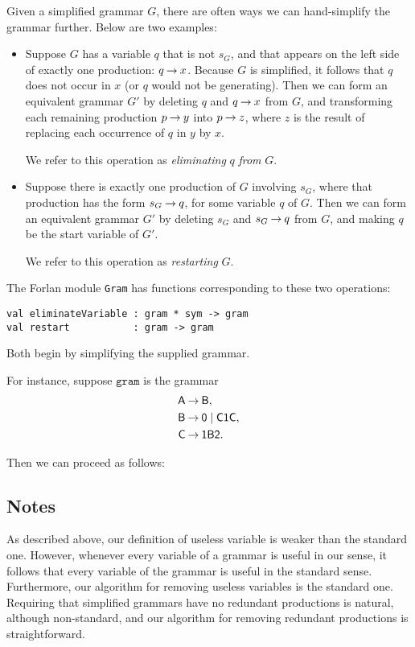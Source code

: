 Given a simplified grammar $G$, there are often ways we can hand-simplify
the grammar further. Below are two examples:
\begin{itemize}
\item Suppose $G$ has a variable $q$ that is not $s_G$, and that
  appears on the left side of exactly one production: $q\mathbin{\to}
  x$. Because $G$ is simplified, it follows that $q$ does not occur in
  $x$ (or $q$ would not be generating).  Then we can form an
  equivalent grammar $G'$ by deleting $q$ and $q\mathbin{\to} x$ from $G$, and
  transforming each remaining production $p\mathbin{\to} y$ into $p\mathbin{\to} z$,
  where $z$ is the result of replacing each occurrence of $q$ in $y$
  by $x$.

  We refer to this operation as \emph{eliminating} $q$ \emph{from}
  $G$.

\item Suppose there is exactly one production of $G$ involving $s_G$,
  where that production has the form $s_G\mathbin{\to} q$, for some variable
  $q$ of $G$. Then we can form an equivalent grammar $G'$ by deleting
  $s_G$ and $s_G\mathbin{\to} q$ from $G$, and making $q$ be the start variable
  of $G'$.

  We refer to this operation as \emph{restarting} $G$.
\end{itemize}

The Forlan module \texttt{Gram} has functions corresponding to these
two operations:
\begin{verbatim}
val eliminateVariable : gram * sym -> gram
val restart           : gram -> gram
\end{verbatim}
Both begin by simplifying the supplied grammar.

For instance, suppose $\texttt{gram}$ is the grammar
\begin{align*}
\mathsf{A} &\mathbin{\to} \mathsf{B}, \\
\mathsf{B} &\mathbin{\to} \mathsf{0} \mid \mathsf{C}\mathsf{1}\mathsf{C} , \\
\mathsf{C} &\mathbin{\to} \mathsf{1}\mathsf{B}\mathsf{2} .
\end{align*}

Then we can proceed as follows:


\subsection{Notes}

As described above, our definition of useless variable is weaker than
the standard one.  However, whenever every variable of a grammar is
useful in our sense, it follows that every variable of the grammar is
useful in the standard sense.  Furthermore, our algorithm for removing
useless variables is the standard one.  Requiring that simplified
grammars have no redundant productions is natural, although
non-standard, and our algorithm for removing redundant productions is
straightforward.

